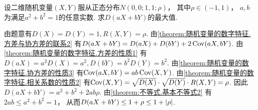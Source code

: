 \begin{example}
设二维随机变量\((X,Y)\)服从正态分布\(N(0,0;1,1;\rho)\)，
其中\(\rho\in(-1,1)\)，
\(a,b\)为满足\(a^2+b^2=1\)的任意实数.
求\(D(aX+bY)\)的最大值.
\begin{solution}
由题意有\(D(X) = D(Y) = 1,
R(X,Y) = \rho\).
由\cref{theorem:随机变量的数字特征.方差与协方差的联系2}
有\(D(aX+bY) = D(aX) + D(bY) + 2 \operatorname{Cov}(aX,bY)\).
由\cref{theorem:随机变量的数字特征.方差的性质1}
有\(D(aX) = a^2 D(X) = a^2,
D(bY) = b^2 D(Y) = b^2\).
由\cref{theorem:随机变量的数字特征.协方差的性质3}
有\(\operatorname{Cov}(aX,bY) = ab \operatorname{Cov}(X,Y)\).
由\cref{theorem:随机变量的数字特征.相关系数的性质2}
有\(\operatorname{Cov}(X,Y) = \sqrt{D(X)} \cdot \sqrt{D(Y)} \cdot R(X,Y)
= \rho\).
因此\(D(aX+bY) = a^2 + b^2 + 2ab\rho\).
由\cref{theorem:不等式.基本不等式2}
有\(2ab \leq a^2 + b^2 = 1\)，
从而\(D(aX+bY) \leq 1+\rho \leq 1+\abs{\rho}\).
\end{solution}
\end{example}
